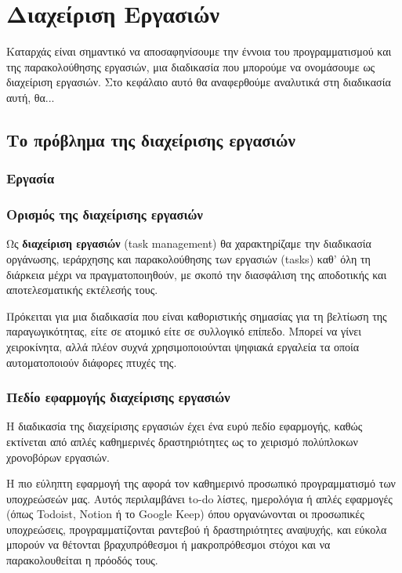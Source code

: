 \chapter{Διαχείριση Εργασιών}
    Καταρχάς είναι σημαντικό να αποσαφηνίσουμε την έννοια του προγραμματισμού και της παρακολούθησης εργασιών, μια διαδικασία που μπορούμε να ονομάσουμε ως διαχείριση εργασιών. Στο κεφάλαιο αυτό θα αναφερθούμε αναλυτικά στη διαδικασία αυτή, θα...
    
    \section{Το πρόβλημα της διαχείρισης εργασιών}

        \subsection{Εργασία}
    
        \subsection{Ορισμός της διαχείρισης εργασιών}
            Ως \textbf{διαχείριση εργασιών} (task management) θα χαρακτηρίζαμε την διαδικασία οργάνωσης, ιεράρχησης και παρακολούθησης των εργασιών (tasks) καθ' όλη τη διάρκεια μέχρι να πραγματοποιηθούν, με σκοπό την διασφάλιση της αποδοτικής και αποτελεσματικής εκτέλεσής τους.
            
            Πρόκειται για μια διαδικασία που είναι καθοριστικής σημασίας για τη βελτίωση της παραγωγικότητας, είτε σε ατομικό είτε σε συλλογικό επίπεδο. Μπορεί να γίνει χειροκίνητα, αλλά πλέον συχνά χρησιμοποιούνται ψηφιακά εργαλεία τα οποία αυτοματοποιούν διάφορες πτυχές της.
        
        \subsection{Πεδίο εφαρμογής διαχείρισης εργασιών}
            Η διαδικασία της διαχείρισης εργασιών έχει ένα ευρύ πεδίο εφαρμογής, καθώς εκτίνεται από απλές καθημερινές δραστηριότητες ως το χειρισμό πολύπλοκων χρονοβόρων εργασιών.        

            Η πιο εύληπτη εφαρμογή της αφορά τον καθημερινό προσωπικό προγραμματισμό των υποχρεώσεών μας. Αυτός περιλαμβάνει to-do λίστες, ημερολόγια ή απλές εφαρμογές (όπως Todoist, Notion ή το Google Keep) όπου οργανώνονται οι προσωπικές υποχρεώσεις, προγραμματίζονται ραντεβού ή δραστηριότητες αναψυχής, και εύκολα μπορούν να θέτονται βραχυπρόθεσμοι ή μακροπρόθεσμοι στόχοι και να παρακολουθείται η πρόοδός τους. \cite{Todoist} \cite{Notion}

